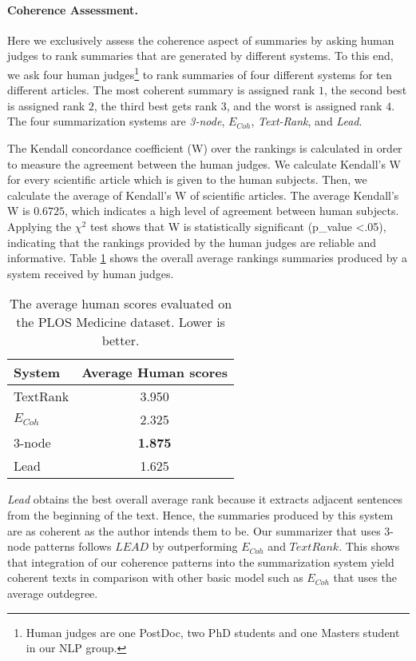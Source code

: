 \paragraph{Coherence Assessment.} 
Here we exclusively assess the coherence aspect of summaries by asking human judges to rank summaries that are generated by different systems. 
To this end, we ask four human judges\footnote{Human judges are one PostDoc, two PhD students and one Masters student in our NLP group.} to rank summaries of four different systems for ten different articles. 
The most coherent summary is assigned rank $1$, the second best is assigned rank $2$, the third best gets rank $3$, and the worst is assigned rank $4$.
The four summarization systems are
\emph{3-node}, \emph{$E_{Coh}$}, \emph{Text-Rank}, and \emph{Lead}.

The Kendall concordance coefficient (W) \cite{siegel88} over the rankings is calculated in order to measure the agreement between the human judges.  
We calculate Kendall's W for every scientific article which is given to the human subjects. 
Then, we calculate the average of Kendall's W of scientific articles. 
The average Kendall's W is $0.6725$,  which indicates a high level of agreement between human subjects.
Applying the $\chi^2$ test shows that W is statistically significant (p\_value <.05), indicating that the rankings provided by the human judges are reliable and informative.
Table \ref{tab:summary-human} shows the overall average rankings summaries produced by a system received by human judges. 

\begin{table}[!ht]
	\begin{center}
		\begin{tabular}{lc}
		\hline
		System 			&  Average Human scores \\
		\hline
		TextRank 		& 3.950					\\
		$E_{Coh}$ 		& 2.325					\\
		3-node			& \textbf{1.875} 		\\
		Lead 			& 1.625					\\
		\hline
		\end{tabular}
	\end{center}
	\caption{The average human scores evaluated on the PLOS Medicine dataset. Lower is better. }
	\label{tab:summary-human}
\end{table}

\emph{Lead} obtains the best overall average rank because it extracts adjacent sentences from the beginning of the text. 
Hence, the summaries produced by this system are as coherent as the author intends them to be. 
Our summarizer that uses 3-node patterns follows $LEAD$ by outperforming $E_{Coh}$ and $TextRank$.  
This shows that integration of our coherence patterns into the summarization system yield coherent texts in comparison with other basic model such as $E_{Coh}$ that uses the average outdegree.  

